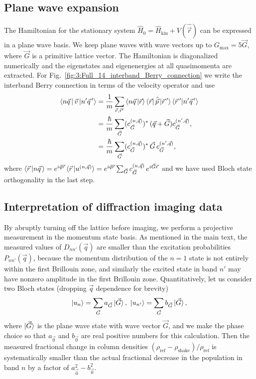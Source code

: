 \documentclass[superscriptaddress, reprint, amsmath, amssymb, aps, prl]{revtex4-2}
\begin{document}
\subsection{Plane wave expansion}\label{sec:plane_wave}
The Hamiltonian for the stationary system $\hat{H}_0 = \hat{H}_{\text{kin}} + V(\hat{\vec{r}})$ can be expressed in a plane wave basis. We keep plane waves with wave vectors up to $G_\text{max}=5 \vec{G}$, where $\vec{G}$ is a primitive lattice vector. The Hamiltonian is diagonalized numerically and the eigenstates and eigenenergies at all quasimomenta are extracted. 
For Fig.~\ref{fig:3:Full_14_interband_Berry_connection} we write the interband Berry connection in terms of the velocity operator \cite{esteve-paredes_comprehensive_2023} and use
\begin{align}
    \bra{n \vec{q}\,} \vec{v} \ket{n' \vec{q}\,'} &= \frac{1}{m} \sum_{\vec{r}, \vec{r}'} \braket{n \vec{q}\, | \vec{r}} \bra{\vec{r}} \hat{\vec{p}} \ket{\vec{r}\,'} \braket{\vec{r}\,'|n' \vec{q}\,'} \\
            &= \frac{\hbar}{m} \sum_{\vec{G}} (c^{(n, \vec{q})}_{\vec{G}})^{*} \, (\vec{q} + \vec{G}) c^{(n', \vec{q})}_{\vec{G}},\\
            &= \frac{\hbar}{m} \sum_{\vec{G}} (c^{(n, \vec{q})}_{\vec{G}})^{*} \, \vec{G} \, c^{(n', \vec{q})}_{\vec{G}},
\end{align}
where $\braket{\vec{r}\, | n \vec{q}\,} = e^{i\vec{q}\vec{r}} \braket{\vec{r}\, | u^{(n,\vec{q})}} = e^{i \vec{q} \vec{r}} \sum_{\vec{G}} c^{(n, \vec{q})}_{\vec{G}} \, e^{i \vec{G} \vec{r}}$ and we have used Bloch state orthogonality in the last step. 

\subsection{Interpretation of diffraction imaging data}\label{sec:diff_and_BM}

By abruptly turning off the lattice before imaging, we perform a projective measurement in the momentum state basis. As mentioned in the main text, the measured values of $D_{n n'}(\vec{q})$ are smaller than the excitation probabilities $P_{n n'}(\vec{q})$, because the momentum distribution of the $n = 1$ state is not entirely within the first Brillouin zone, and similarly the excited state in band $n'$ may have nonzero amplitude in the first Brillouin zone. Quantitatively, let us consider two Bloch states (dropping $\vec{q}$ dependence for brevity)
\begin{equation*}
    \ket{u_n} = \sum_{\vec{G}} a_{\vec{G}} \ket{\vec{G}},\ \ket{u_{n'}} = \sum_{\vec{G}} b_{\vec{G}} \ket{\vec{G}},
\end{equation*}
where $\ket{\vec{G}}$ is the plane wave state with wave vector $\vec{G}$, and we make the phase choice so that $a_{\vec{0}}$ and $b_{\vec{0}}$ are real positive numbers for this calculation. Then the measured fractional change in column densities $(\rho_{\mathrm{ref}} - \rho_{\mathrm{shake}})/\rho_\mathrm{ref}$ is systematically smaller than the actual fractional decrease in the population in band $n$ by a factor of $a_{\vec{0}}^2 - b_{\vec{0}}^2$.
\end{document}
